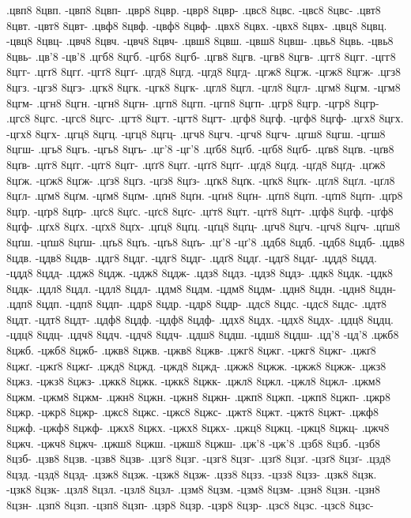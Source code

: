 {.цвп8 8цвп. -цвп8 8цвп-
.цвр8 8цвр. -цвр8 8цвр-
.цвс8 8цвс. -цвс8 8цвс-
.цвт8 8цвт. -цвт8 8цвт-
.цвф8 8цвф. -цвф8 8цвф-
.цвх8 8цвх. -цвх8 8цвх-
.цвц8 8цвц. -цвц8 8цвц-
.цвч8 8цвч. -цвч8 8цвч-
.цвш8 8цвш. -цвш8 8цвш-
.цвь8 8цвь. -цвь8 8цвь-
.цв'8 -цв'8
.цгб8 8цгб. -цгб8 8цгб-
.цгв8 8цгв. -цгв8 8цгв-
.цгг8 8цгг. -цгг8 8цгг-
.цгґ8 8цгґ. -цгґ8 8цгґ-
.цгд8 8цгд. -цгд8 8цгд-
.цгж8 8цгж. -цгж8 8цгж-
.цгз8 8цгз. -цгз8 8цгз-
.цгк8 8цгк. -цгк8 8цгк-
.цгл8 8цгл. -цгл8 8цгл-
.цгм8 8цгм. -цгм8 8цгм-
.цгн8 8цгн. -цгн8 8цгн-
.цгп8 8цгп. -цгп8 8цгп-
.цгр8 8цгр. -цгр8 8цгр-
.цгс8 8цгс. -цгс8 8цгс-
.цгт8 8цгт. -цгт8 8цгт-
.цгф8 8цгф. -цгф8 8цгф-
.цгх8 8цгх. -цгх8 8цгх-
.цгц8 8цгц. -цгц8 8цгц-
.цгч8 8цгч. -цгч8 8цгч-
.цгш8 8цгш. -цгш8 8цгш-
.цгь8 8цгь. -цгь8 8цгь-
.цг'8 -цг'8
.цґб8 8цґб. -цґб8 8цґб-
.цґв8 8цґв. -цґв8 8цґв-
.цґг8 8цґг. -цґг8 8цґг-
.цґґ8 8цґґ. -цґґ8 8цґґ-
.цґд8 8цґд. -цґд8 8цґд-
.цґж8 8цґж. -цґж8 8цґж-
.цґз8 8цґз. -цґз8 8цґз-
.цґк8 8цґк. -цґк8 8цґк-
.цґл8 8цґл. -цґл8 8цґл-
.цґм8 8цґм. -цґм8 8цґм-
.цґн8 8цґн. -цґн8 8цґн-
.цґп8 8цґп. -цґп8 8цґп-
.цґр8 8цґр. -цґр8 8цґр-
.цґс8 8цґс. -цґс8 8цґс-
.цґт8 8цґт. -цґт8 8цґт-
.цґф8 8цґф. -цґф8 8цґф-
.цґх8 8цґх. -цґх8 8цґх-
.цґц8 8цґц. -цґц8 8цґц-
.цґч8 8цґч. -цґч8 8цґч-
.цґш8 8цґш. -цґш8 8цґш-
.цґь8 8цґь. -цґь8 8цґь-
.цґ'8 -цґ'8
.цдб8 8цдб. -цдб8 8цдб-
.цдв8 8цдв. -цдв8 8цдв-
.цдг8 8цдг. -цдг8 8цдг-
.цдґ8 8цдґ. -цдґ8 8цдґ-
.цдд8 8цдд. -цдд8 8цдд-
.цдж8 8цдж. -цдж8 8цдж-
.цдз8 8цдз. -цдз8 8цдз-
.цдк8 8цдк. -цдк8 8цдк-
.цдл8 8цдл. -цдл8 8цдл-
.цдм8 8цдм. -цдм8 8цдм-
.цдн8 8цдн. -цдн8 8цдн-
.цдп8 8цдп. -цдп8 8цдп-
.цдр8 8цдр. -цдр8 8цдр-
.цдс8 8цдс. -цдс8 8цдс-
.цдт8 8цдт. -цдт8 8цдт-
.цдф8 8цдф. -цдф8 8цдф-
.цдх8 8цдх. -цдх8 8цдх-
.цдц8 8цдц. -цдц8 8цдц-
.цдч8 8цдч. -цдч8 8цдч-
.цдш8 8цдш. -цдш8 8цдш-
.цд'8 -цд'8
.цжб8 8цжб. -цжб8 8цжб-
.цжв8 8цжв. -цжв8 8цжв-
.цжг8 8цжг. -цжг8 8цжг-
.цжґ8 8цжґ. -цжґ8 8цжґ-
.цжд8 8цжд. -цжд8 8цжд-
.цжж8 8цжж. -цжж8 8цжж-
.цжз8 8цжз. -цжз8 8цжз-
.цжк8 8цжк. -цжк8 8цжк-
.цжл8 8цжл. -цжл8 8цжл-
.цжм8 8цжм. -цжм8 8цжм-
.цжн8 8цжн. -цжн8 8цжн-
.цжп8 8цжп. -цжп8 8цжп-
.цжр8 8цжр. -цжр8 8цжр-
.цжс8 8цжс. -цжс8 8цжс-
.цжт8 8цжт. -цжт8 8цжт-
.цжф8 8цжф. -цжф8 8цжф-
.цжх8 8цжх. -цжх8 8цжх-
.цжц8 8цжц. -цжц8 8цжц-
.цжч8 8цжч. -цжч8 8цжч-
.цжш8 8цжш. -цжш8 8цжш-
.цж'8 -цж'8
.цзб8 8цзб. -цзб8 8цзб-
.цзв8 8цзв. -цзв8 8цзв-
.цзг8 8цзг. -цзг8 8цзг-
.цзґ8 8цзґ. -цзґ8 8цзґ-
.цзд8 8цзд. -цзд8 8цзд-
.цзж8 8цзж. -цзж8 8цзж-
.цзз8 8цзз. -цзз8 8цзз-
.цзк8 8цзк. -цзк8 8цзк-
.цзл8 8цзл. -цзл8 8цзл-
.цзм8 8цзм. -цзм8 8цзм-
.цзн8 8цзн. -цзн8 8цзн-
.цзп8 8цзп. -цзп8 8цзп-
.цзр8 8цзр. -цзр8 8цзр-
.цзс8 8цзс. -цзс8 8цзс-
}

